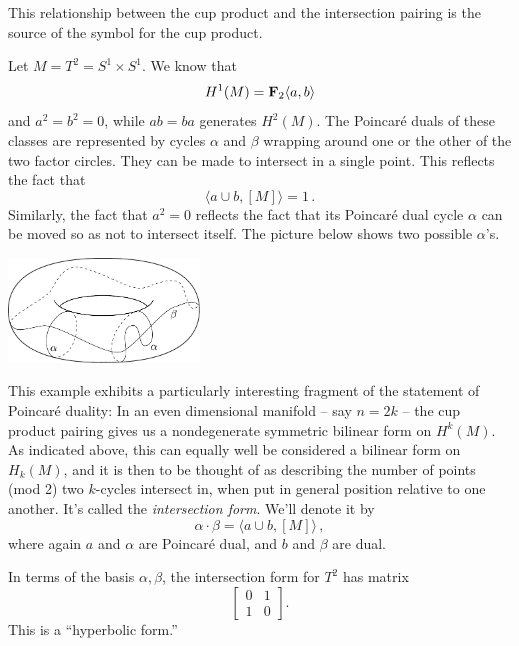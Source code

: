 This relationship between the cup product and the intersection pairing is 
the source of the symbol for the cup product.

\begin{example}
Let $M=T^2=S^1\times S^1$. We know that 
\[
H^1(M)=\mathbf F_2\langle a,b\rangle
\]
and $a^2=b^2=0$, while $ab=ba$ generates $H^2(M)$.
The Poincar\'e duals of these classes are represented by cycles $\alpha$
and $\beta$ wrapping 
around one or the other of the two factor circles. They can be made to 
intersect in a single point. This reflects the fact that 
\[
\langle a\cup b,[M]\rangle=1\,.
\]
Similarly, the fact that $a^2=0$ reflects the fact that its Poincar\'e 
dual cycle $\alpha$ can be moved so as not to intersect itself. The picture 
below shows two possible $\alpha$'s.

\medskip
\begin{center}
\includegraphics[width=2in]{905/Figures/30-torus-cycle-intersections.pdf}
\end{center}

\end{example}

This example exhibits a particularly interesting fragment of the statement
of Poincar\'e duality: In an even dimensional manifold -- say $n=2k$ -- the
cup product pairing gives us a nondegenerate symmetric bilinear form on 
$H^k(M)$. As indicated above, this can equally well be considered a bilinear
form on $H_k(M)$, and it is then to be thought of as describing the number of
points (mod 2) two $k$-cycles intersect in, when put in general position 
relative to one another. It's called the {\em intersection form}. We'll 
denote it by 
\[
\alpha\cdot\beta=\langle a\cup b,[M]\rangle\,,
\]
where again $a$ and $\alpha$ are Poincar\'e dual, and $b$ and $\beta$ are dual.

\begin{example} In terms of the basis $\alpha,\beta$, the intersection form
for $T^2$ has matrix 
\[
\left[\begin{array}{cc}0&1\\1&0\end{array}\right].
\]
This is a ``hyperbolic form.'' 
\end{example}

